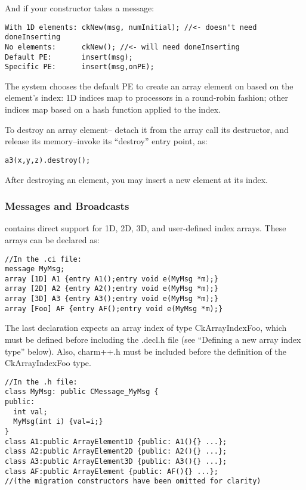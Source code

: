 And if your constructor takes a message:
\begin{verbatim}
With 1D elements: ckNew(msg, numInitial); //<- doesn't need doneInserting
No elements:      ckNew(); //<- will need doneInserting
Default PE:       insert(msg);
Specific PE:      insert(msg,onPE);
\end{verbatim}

The system chooses the default PE to create an array element on
based on the element's index: 1D indices map to processors in
a round-robin fashion; other indices map based on a hash function
applied to the index.

To destroy an array element-- detach it from the array
call its destructor, and release its memory--invoke its ``destroy'' 
entry point, as:
\begin{verbatim}
a3(x,y,z).destroy();
\end{verbatim}

After destroying an element, you may insert a new element at
its index.


\subsubsection{Messages and Broadcasts}

\charmpp contains direct support for 1D, 2D, 3D, and user-defined
index arrays.  These arrays can be declared as:

\begin{verbatim}
//In the .ci file:
message MyMsg;
array [1D] A1 {entry A1();entry void e(MyMsg *m);}
array [2D] A2 {entry A2();entry void e(MyMsg *m);}
array [3D] A3 {entry A3();entry void e(MyMsg *m);}
array [Foo] AF {entry AF();entry void e(MyMsg *m);}
\end{verbatim}

The last declaration expects an array index of type CkArrayIndexFoo,
which must be defined before including the .decl.h file 
(see ``Defining a new array index type'' below).  Also, charm++.h must be included before the definition of the CkArrayIndexFoo type. 

\begin{verbatim}
//In the .h file:
class MyMsg: public CMessage_MyMsg {
public: 
  int val;
  MyMsg(int i) {val=i;}
}
class A1:public ArrayElement1D {public: A1(){} ...};
class A2:public ArrayElement2D {public: A2(){} ...};
class A3:public ArrayElement3D {public: A3(){} ...};
class AF:public ArrayElement {public: AF(){} ...};
//(the migration constructors have been omitted for clarity)
\end{verbatim}

